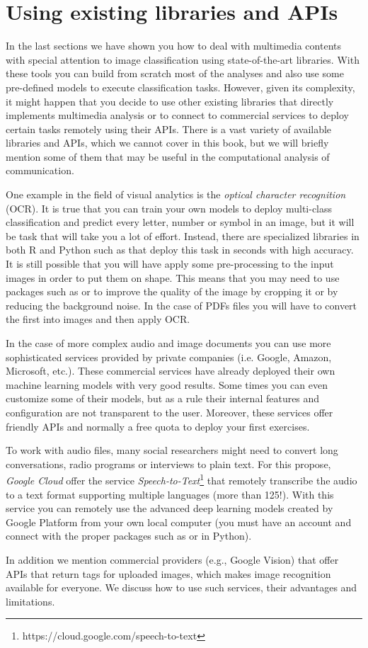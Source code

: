 \section{Using existing libraries and APIs}
\label{sec:apivisions}

In the last sections we have shown you how to deal with multimedia contents with special attention to image classification using state-of-the-art libraries. With these tools you can build from scratch most of the analyses and also use some pre-defined models to execute classification tasks. However, given its complexity, it might happen that you decide to use other existing libraries that directly implements multimedia analysis or to connect to commercial services to deploy certain tasks remotely using their APIs. There is a vast variety of available libraries and APIs, which we cannot cover in this book, but we will briefly mention some of them that may be useful in the computational analysis of communication.

One example in the field of visual analytics is the \textit{optical character recognition} (OCR). It is true that you can train your own models to deploy multi-class classification and predict every letter, number or symbol in an image, but it will be task that will take you a lot of effort. Instead, there are specialized libraries in both R and Python such as  that deploy this task in seconds with high accuracy. It is still possible that you will have apply some pre-processing to the input images in order to put them on shape. This means that you may need to use packages such as  or  to improve the quality of the image by cropping it or by reducing the background noise.  In the case of PDFs files you will have to convert the first into images and then apply OCR.

In the case of more complex audio and image documents you can use more sophisticated services provided by private companies (i.e. Google, Amazon, Microsoft, etc.). These commercial services have already deployed their own machine learning models with very good results. Some times you can even customize some of their models, but as a rule their internal features and configuration are not transparent to the user. Moreover, these services offer friendly APIs and normally a free quota to deploy your first exercises.

To work with audio files, many social researchers might need to convert long conversations, radio programs or interviews to plain text. For this propose, \textit{Google Cloud} offer the service \textit{Speech-to-Text}\footnote{https://cloud.google.com/speech-to-text}  that remotely transcribe the audio to a text format supporting multiple languages (more than 125!). With this service you can remotely use the advanced deep learning models created by Google Platform from your own local computer (you must have an account and connect with the proper packages such as  or  in Python).


In addition we mention commercial providers (e.g., Google Vision) that offer APIs that return tags for uploaded images, which makes image recognition available for everyone. We discuss how to use such services, their advantages and limitations.

